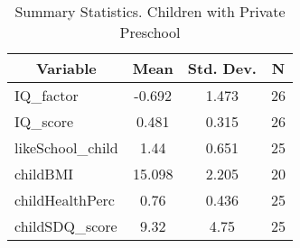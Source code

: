 
\begin{table}[htbp]\centering \caption{Summary Statistics. Children with Private Preschool \label{schoolChildmaternaPriv}}
\begin{tabular}{l c c  c}\hline\hline
\multicolumn{1}{c}{\textbf{Variable}} & \textbf{Mean}
 & \textbf{Std. Dev.} & \textbf{N}\\ \hline
IQ\_factor & -0.692 & 1.473  & 26\\
IQ\_score & 0.481 & 0.315  & 26\\
likeSchool\_child & 1.44 & 0.651  & 25\\
childBMI & 15.098 & 2.205  & 20\\
childHealthPerc & 0.76 & 0.436  & 25\\
childSDQ\_score & 9.32 & 4.75  & 25\\
\hline\end{tabular}
\end{table}
